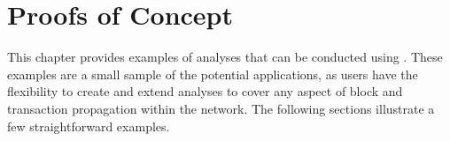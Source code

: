\chapter{Proofs of Concept}\label{ch:pocs}

This chapter provides examples of analyses that can be conducted using
\iblock{}. These examples are a small sample of the potential applications, as
users have the flexibility to create and extend analyses to cover any aspect of
block and transaction propagation within the network. The following sections
illustrate a few straightforward examples.




